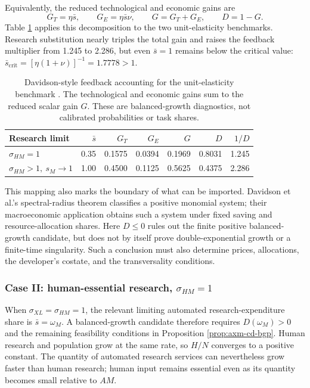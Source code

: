 Equivalently, the reduced technological and economic gains are
\[
 G_T=\eta\bar s,\qquad
 G_E=\eta\bar s\nu,\qquad
 G=G_T+G_E,\qquad D=1-G.
\]
Table \ref{tab:axm-feedback-accounting} applies this decomposition to the two
unit-elasticity benchmarks. Research substitution nearly triples the total gain
and raises the feedback multiplier from 1.245 to 2.286, but even
\(\bar s=1\) remains below the critical value:
\(\bar s_{\mathrm{crit}}=[\eta(1+\nu)]^{-1}=1.7778>1\).

\begin{table}[H]
\centering
\small
\begin{tabular}{lrrrrrr}
\toprule
Research limit & \(\bar s\) & \(G_T\) & \(G_E\) & \(G\) & \(D\) & \(1/D\)\\
\midrule
\(\sigma_{HM}=1\) & 0.35 & 0.1575 & 0.0394 & 0.1969 & 0.8031 & 1.245\\
\(\sigma_{HM}>1,\ s_M\to1\) & 1.00 & 0.4500 & 0.1125 & 0.5625 & 0.4375 & 2.286\\
\bottomrule
\end{tabular}
\caption{Davidson-style feedback accounting for the unit-elasticity benchmark
\citep{davidsonetal2026}. The technological and economic gains sum to the reduced scalar gain \(G\).
These are balanced-growth diagnostics, not calibrated probabilities or task
shares.}
\label{tab:axm-feedback-accounting}
\end{table}

This mapping also marks the boundary of what can be imported. Davidson et al.'s
spectral-radius theorem classifies a positive monomial system; their macroeconomic
application obtains such a system under fixed saving and resource-allocation
shares. Here \(D\leq0\) rules out the finite positive
balanced-growth candidate, but does not by itself prove double-exponential growth
or a finite-time singularity. Such a conclusion must also determine prices,
allocations, the developer's costate, and the transversality conditions.

\subsubsection{\texorpdfstring{Case II: human-essential research, \(\sigma_{HM}=1\)}{Case II: human-essential research, sigma HM = 1}}
\label{sec:axm-case-human-essential}

When \(\sigma_{XL}=\sigma_{HM}=1\), the relevant limiting automated
research-expenditure share is \(\bar s=\omega_M\). A balanced-growth candidate
therefore requires \(D(\omega_M)>0\) and the remaining feasibility conditions in
Proposition \ref{prop:axm-cd-bgp}. Human research and population grow at the same
rate, so \(H/N\) converges to a positive constant. The quantity of automated
research services can nevertheless grow faster than human research; human input
remains essential even as its quantity becomes small relative to \(AM\).

